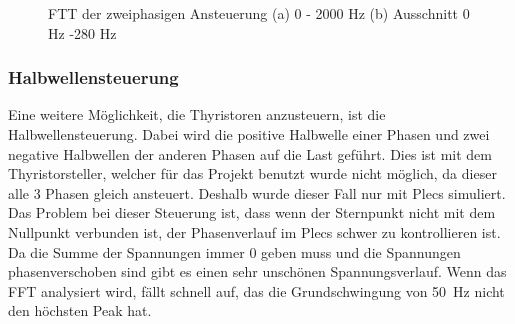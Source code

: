 \begin{figure}[ht!]
	\centering
	\qquad
	\caption{FTT der zweiphasigen Ansteuerung  (a) 0 - 2000 Hz (b) Ausschnitt 0 Hz -280 Hz}
	\label{fig:2_phasige_ansteuerung_mit_Last_FFT}
\end{figure}




\subsubsection*{Halbwellensteuerung}
Eine weitere Möglichkeit, die Thyristoren anzusteuern, ist die Halbwellensteuerung. Dabei wird die positive Halbwelle einer Phasen und zwei negative Halbwellen der anderen Phasen auf die Last geführt. Dies ist mit dem Thyristorsteller, welcher für das Projekt benutzt wurde nicht möglich, da dieser alle 3 Phasen gleich ansteuert. Deshalb wurde dieser Fall nur mit Plecs simuliert.  Das Problem bei dieser Steuerung ist, dass wenn der Sternpunkt nicht mit dem Nullpunkt verbunden ist, der Phasenverlauf im Plecs schwer zu kontrollieren ist. Da die Summe der Spannungen immer 0 geben muss und die Spannungen phasenverschoben sind gibt es einen sehr unschönen Spannungsverlauf. Wenn das FFT analysiert wird, fällt schnell auf, das die Grundschwingung von \SI{50}{Hz} nicht den höchsten Peak hat.



